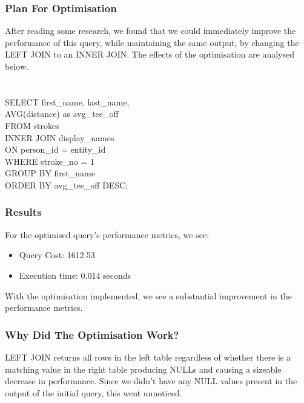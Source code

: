 \documentclass[titlepage]{article}
\begin{document}
\subsubsection{Plan For Optimisation}
After reading some research, we found that we could immediately improve the performance of this query,
while maintaining the same output, by changing the LEFT JOIN to an INNER JOIN. The effects of the 
optimisation are analysed below. \\ \\ \\
\hspace{15pt}SELECT first\_name, last\_name, \\
\hspace{15pt}AVG(distance) as avg\_tee\_off \\
\hspace{15pt}FROM strokes \\
\hspace{15pt}INNER JOIN display\_names \\
\hspace{15pt}ON person\_id = entity\_id \\
\hspace{15pt}WHERE stroke\_no = 1 \\
\hspace{15pt}GROUP BY first\_name \\
\hspace{15pt}ORDER BY avg\_tee\_off DESC; \\
\vspace{1em}
\subsubsection{Results}
\vspace{1em}
For the optimised query's performance metrics, we see:
\begin{itemize}
  \item Query Cost: 1612.53
  \item Execution time: 0.014 seconds
\end{itemize}
\vspace{1em}
With the optimisation implemented, we see a substantial improvement in the performance metrics.
\vspace{1em}
\subsubsection{Why Did The Optimisation Work?}
LEFT JOIN returns all rows in the left table regardless of whether there is a matching value in the right
table producing NULLs and causing a sizeable decrease in performance. Since we didn't have any NULL values
present in the output of the initial query, this went unnoticed.\\
\end{document}
